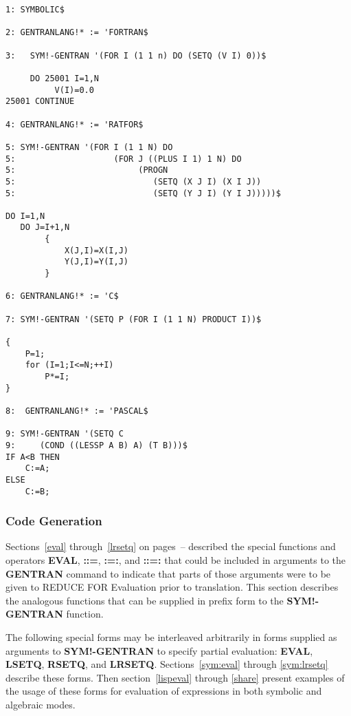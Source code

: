 \begin{describe}{\example}
\begin{verbatim}
1: SYMBOLIC$ 

2: GENTRANLANG!* := 'FORTRAN$

3:   SYM!-GENTRAN '(FOR I (1 1 n) DO (SETQ (V I) 0))$

     DO 25001 I=1,N
          V(I)=0.0
25001 CONTINUE

4: GENTRANLANG!* := 'RATFOR$

5: SYM!-GENTRAN '(FOR I (1 1 N) DO 
5:                    (FOR J ((PLUS I 1) 1 N) DO 
5:                         (PROGN 
5:                            (SETQ (X J I) (X I J)) 
5:                            (SETQ (Y J I) (Y I J)))))$ 

DO I=1,N
   DO J=I+1,N
        {
            X(J,I)=X(I,J)
            Y(J,I)=Y(I,J)
        }

6: GENTRANLANG!* := 'C$ 

7: SYM!-GENTRAN '(SETQ P (FOR I (1 1 N) PRODUCT I))$

{
    P=1;
    for (I=1;I<=N;++I)
        P*=I;
}

8:  GENTRANLANG!* := 'PASCAL$

9: SYM!-GENTRAN '(SETQ C
9:     (COND ((LESSP A B) A) (T B)))$
IF A<B THEN
    C:=A;
ELSE
    C:=B;

\end{verbatim}
\end{describe}


\subsubsection{Code Generation} 
\label{sym:cg}
Sections~\ref{eval} through~\ref{lrsetq} on
pages~\pageref{eval}--\pageref{lrsetq} described the special functions
and operators {\bf EVAL}, {\bf ::=}, {\bf :=:}, and {\bf ::=:} that
could be included in arguments to the {\bf GENTRAN} command to
indicate that parts of those arguments were to be given to REDUCE FOR
Evaluation prior to translation.  This section describes the analogous
functions that can be supplied in prefix form to the {\bf SYM!-GENTRAN}
function.

The following special forms may be interleaved arbitrarily in forms
supplied as arguments to {\bf SYM!-GENTRAN} to specify partial
   
evaluation:  {\bf EVAL}, {\bf LSETQ}, {\bf RSETQ}, and {\bf LRSETQ}.
Sections~\ref{sym:eval} through \ref{sym:lrsetq} describe these forms. Then
section~\ref{lispeval} through \ref{share}
present examples of the usage of these
forms for evaluation of expressions in both symbolic and algebraic modes.

